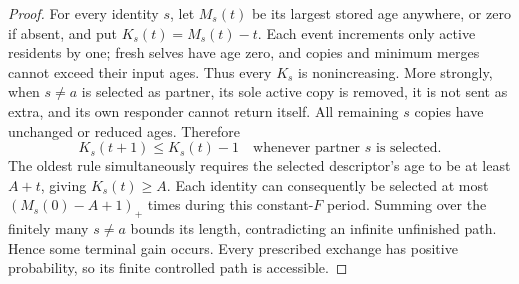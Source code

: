 \documentclass[11pt]{article}
\begin{document}
\begin{proof}
For every identity $s$, let $M_s(t)$ be its largest
stored age anywhere, or zero if absent, and put
$K_s(t)=M_s(t)-t$. Each event increments only active
residents by one; fresh selves have age zero, and
copies and minimum merges cannot exceed their input
ages. Thus every $K_s$ is nonincreasing. More strongly,
when $s\ne a$ is selected as partner, its sole active
copy is removed, it is not sent as extra, and its own
responder cannot return itself. All remaining $s$
copies have unchanged or reduced ages. Therefore
\[
 K_s(t+1)\le K_s(t)-1
 \quad\text{whenever partner }s\text{ is selected}.
\]
The oldest rule simultaneously requires the selected
descriptor's age to be at least $A+t$, giving
$K_s(t)\ge A$. Each identity can consequently be
selected at most $(M_s(0)-A+1)_+$ times during this
constant-$F$ period. Summing over the finitely many
$s\ne a$ bounds its length, contradicting an infinite
unfinished path. Hence some terminal gain occurs.
Every prescribed exchange has positive probability,
so its finite controlled path is accessible.
\end{proof}
\end{document}
